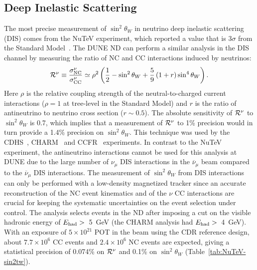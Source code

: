 \subsection{Deep Inelastic Scattering} 
\label{ssec:nd:dis}
The most precise measurement of $\sin^2 \theta_W$ in
neutrino deep inelastic scattering (DIS) comes from the NuTeV experiment, which reported
a value that is $3\sigma$ from the Standard Model~\cite{Zeller:2001hh}. 
The DUNE ND can perform a similar
analysis in the DIS channel by measuring the ratio of NC and CC interactions induced by
neutrinos:
\begin{equation}
{\cal R}^\nu \equiv \frac{\sigma^\nu_{\rm NC}}{\sigma^\nu_{\rm CC}}
 \simeq \rho^2 \left( \frac{1}{2} - \sin^2 \theta_W +\frac{5}{9} \left(1 + r \right) \sin^4 \theta_W  \right).
\end{equation}
\noindent
Here $\rho$ is the relative coupling strength of the
neutral-to-charged current interactions ($\rho =1$ at tree-level in
the Standard Model) and $r$ is the ratio of antineutrino to neutrino
cross section ($r\sim0.5$).  The absolute sensitivity of ${\cal
  R}^\nu$ to $\sin^2 \theta_W$ is 0.7, which implies that a
measurement of ${\cal R}^\nu$ to 1\% precision would in turn provide a
1.4\% precision on $\sin^2 \theta_W$.  This technique was used by the
CDHS~\cite{Abramowicz:1986vi}, CHARM~\cite{Allaby:1987vr} and CCFR~\cite{Reutens:1985hv} 
experiments. In contrast to the NuTeV experiment, the antineutrino
interactions cannot be used for this analysis at DUNE due to the large
number of $\nu_\mu$ DIS interactions in the $\overline{\nu}_\mu$ beam
compared to the $\overline{\nu}_\mu$ DIS interactions.
The measurement of $\sin^2 \theta_W$ from DIS interactions can only be
performed with a low-density magnetized tracker since an accurate
reconstruction of the NC event kinematics and of the $\nu$ CC
interactions are crucial for keeping the systematic uncertainties on
the event selection under control. The analysis selects events in the
ND after imposing a cut on the visible hadronic energy of $E_{\rm had}
>$~\SI{5}{\GeV} (the CHARM analysis had $E_{\rm had} >$~\SI{4}{\GeV}).
With an exposure of $5\times 10^{21}$ POT in the 
beam using the CDR reference design, about $7.7 \times 10^6$ CC events
and $2.4 \times 10^6$ NC events are expected, giving a statistical
precision of 0.074\% on ${\cal R}^\nu$ and 0.1\% on $\sin^2 \theta_W$
(Table~\ref{tab:NuTeV-sin2tw}).

